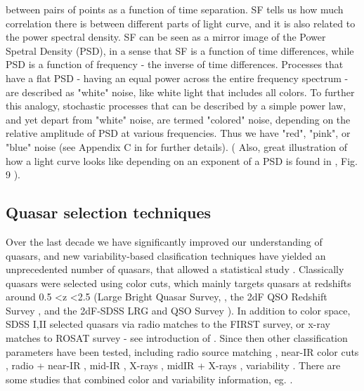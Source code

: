 \documentclass[modern]{aastex62}
\begin{document}
between pairs of points as a function of time separation. SF tells us how much correlation there is between different parts of light curve, and it is also related to the power spectral density. SF can be seen as a mirror image of the Power Spetral Density (PSD), in a sense that SF is a function of time differences, while PSD is a function of frequency - the inverse of  time differences. Processes that have a flat PSD - having an equal power across the entire frequency spectrum -  are described as "white" noise, like white light that includes all colors. To further this analogy, stochastic processes that can be described by a simple power law, and yet depart from "white" noise, are termed  "colored" noise, depending on the relative amplitude of PSD at various frequencies. Thus we have "red", "pink", or "blue" noise   (see Appendix  C in \cite{kasliwal2017} for further details). ( Also, great illustration of how a light curve looks like depending on an exponent of a PSD is found in \cite{macleod2010}, Fig. 9 ). 


\subsection{Quasar selection techniques}
Over the last decade we have significantly improved our understanding of quasars, and new variability-based clasification techniques have yielded an unprecedented number of quasars, that allowed a statistical study \citep{fan2001, richards2006, kozlowski2010, palanque2011, macleod2011, graham2014, alsayyad2016, ruan2017}.  
Classically quasars were selected using color cuts,  which mainly targets quasars at redshifts around 0.5 \textless  z \textless 2.5 (Large Bright Quasar Survey, \cite{hewett1995}, the 2dF QSO Redshift Survey \cite{croom2004}, and the 2dF-SDSS LRG and QSO Survey \cite{croom2009}).  In addition to color space, SDSS I,II selected quasars via radio matches to the FIRST survey, or x-ray matches to ROSAT survey  - see introduction of \citep{myers2015}. Since then other classification parameters have been tested, including radio source matching \citep{mcgreer2009}, near-IR color cuts \citep{banerji2012},  radio + near-IR \citep{glikman2012}, mid-IR \citep{stern2005, richards2009a, stern2012}, X-rays \citep{trichas2012},  midIR + X-rays \citep{lacy2004, hickox2007, hickox2009}, variability \citep{schmidt2010, butler2011, macleod2011, palanque2011}. There are some studies that combined color and variability information, eg. \cite{tie2017, peters2015, sesar2007}. 
\end{document}
